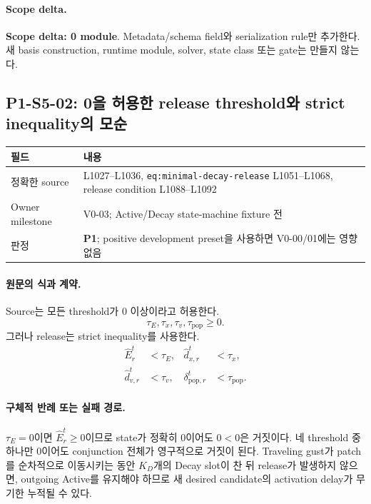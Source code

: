 \documentclass[11pt]{article}
\newcommand{\src}[1]{\textcolor{CoreBlue}{\nolinkurl{#1}}}
\newcommand{\pone}{\textcolor{WarnOrange}{\textbf{P1}}}
\newcommand{\scopezero}{\textcolor{SafeGreen}{\textbf{Scope delta: 0 module}}}
\begin{document}
\paragraph{Scope delta.}
\scopezero. Metadata/schema field와 serialization rule만 추가한다.
새 basis construction, runtime module, solver, state class 또는 gate는 만들지 않는다.

\subsection{P1-S5-02: 0을 허용한 release threshold와 strict inequality의 모순}

\begin{tabularx}{\textwidth}{L{0.22\textwidth}Y}
\toprule
필드 & 내용 \\
\midrule
정확한 source & L1027--L1036, \src{eq:minimal-decay-release} L1051--L1068, release condition L1088--L1092 \\
Owner milestone & V0-03; Active/Decay state-machine fixture 전 \\
판정 & \pone; positive development preset을 사용하면 V0-00/01에는 영향 없음 \\
\bottomrule
\end{tabularx}

\paragraph{원문의 식과 계약.}
Source는 모든 threshold가 0 이상이라고 허용한다.
\begin{equation}
  \tau_E,\tau_x,\tau_v,\tau_{\mathrm{pop}}\geq0.
\end{equation}
그러나 release는 strict inequality를 사용한다.
\begin{equation}
\begin{aligned}
  \widehat E_r^t&<\tau_E, &
  \widehat d_{x,r}^t&<\tau_x,\\
  \widehat d_{v,r}^t&<\tau_v, &
  \delta_{\mathrm{pop},r}^t&<\tau_{\mathrm{pop}}.
\end{aligned}
\tag{source: L1088--L1092}
\end{equation}

\paragraph{구체적 반례 또는 실패 경로.}
$\tau_E=0$이면 $\widehat E_r^t\geq0$이므로 state가 정확히 0이어도
$0<0$은 거짓이다. 네 threshold 중 하나만 0이어도 conjunction 전체가 영구적으로 거짓이 된다.
Traveling gust가 patch를 순차적으로 이동시키는 동안 $K_D$개의 Decay slot이 찬 뒤 release가 발생하지 않으면,
outgoing Active를 유지해야 하므로 새 desired candidate의 activation delay가 무기한 누적될 수 있다.
\end{document}
